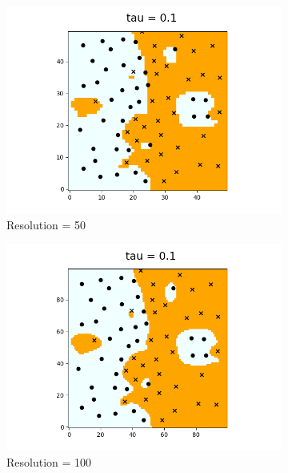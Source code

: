 \documentclass{article}
\begin{document}
\begin{figure}[h]
    \centering
  
    \begin{subfigure}{0.3\textwidth}
      \centering
      \includegraphics[width=\linewidth]{res_50_tau_0point1}
      \caption{Resolution = 50}
      \label{fig:subfig1}
    \end{subfigure}%
    \hfill
    \begin{subfigure}{0.3\textwidth}
      \centering
      \includegraphics[width=\linewidth]{res_100_tau_0point1}
      \caption{Resolution = 100}
      \label{fig:subfig2}
    \end{subfigure}%
    \hfill
    \begin{subfigure}{0.3\textwidth}

\end{subfigure}
\end{figure}
\end{document}
